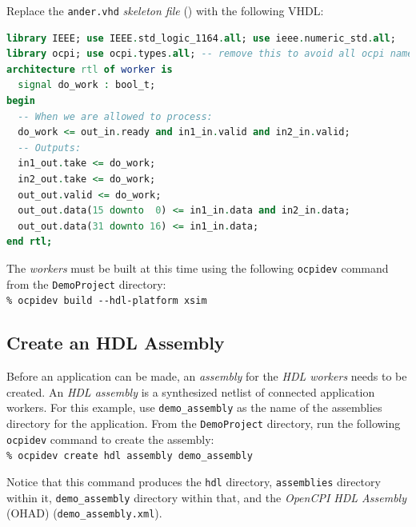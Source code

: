 \bend

\bstart
Replace the \verb+ander.vhd+ \textit{skeleton file}  () with the following VHDL:

\begin{lstlisting}[language=vhdl, columns=fullflexible, breaklines=true, prebreak=\textbackslash, basicstyle=\ttfamily, showstringspaces=false, upquote=true]
library IEEE; use IEEE.std_logic_1164.all; use ieee.numeric_std.all;
library ocpi; use ocpi.types.all; -- remove this to avoid all ocpi name collisions
architecture rtl of worker is
  signal do_work : bool_t;
begin
  -- When we are allowed to process:
  do_work <= out_in.ready and in1_in.valid and in2_in.valid;
  -- Outputs:
  in1_out.take <= do_work;
  in2_out.take <= do_work;
  out_out.valid <= do_work;
  out_out.data(15 downto  0) <= in1_in.data and in2_in.data;
  out_out.data(31 downto 16) <= in1_in.data;
end rtl;
\end{lstlisting}
\bend
\label{example:buildworkers}
The \textit{workers} must be built at this time using the following \verb+ocpidev+ command from the \verb+DemoProject+ directory:\\

\forceindent\verb+% ocpidev build --hdl-platform xsim+
\OcpidevBuild

\subsection{Create an HDL Assembly}
Before an application can be made, an \textit{assembly} for the \textit{HDL workers} needs to be created. An \textit{HDL assembly} is a synthesized netlist of connected application workers. For this example, use \verb+demo_assembly+ as the name of the assemblies directory for the application. From the \verb+DemoProject+ directory, run the following \verb+ocpidev+ command to create the assembly:\\

\forceindent\verb+% ocpidev create hdl assembly demo_assembly+\\
\OcpidevCreate{}

\bstart
Notice that this command produces the \verb+hdl+ directory, \verb+assemblies+ directory within it, \verb+demo_assembly+ directory within that, and the \textit{OpenCPI HDL Assembly} (OHAD) (\verb+demo_assembly.xml+).

